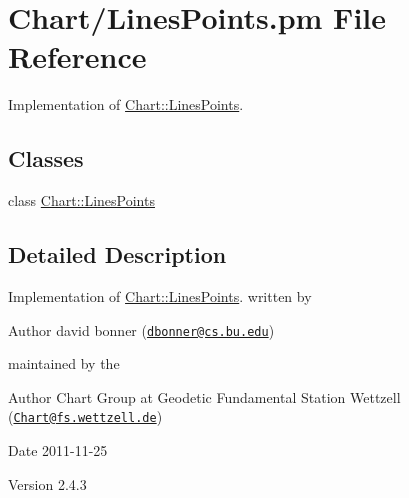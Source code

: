 \hypertarget{LinesPoints_8pm}{
\section{Chart/LinesPoints.pm File Reference}
\label{LinesPoints_8pm}
}


Implementation of \hyperlink{classChart_1_1LinesPoints}{Chart::LinesPoints}.  


\subsection*{Classes}
\begin{DoxyCompactItemize}
\item 
class \hyperlink{classChart_1_1LinesPoints}{Chart::LinesPoints}
\end{DoxyCompactItemize}


\subsection{Detailed Description}
Implementation of \hyperlink{classChart_1_1LinesPoints}{Chart::LinesPoints}. written by \begin{DoxyAuthor}{Author}
david bonner (\href{mailto:dbonner@cs.bu.edu}{\tt dbonner@cs.bu.edu})
\end{DoxyAuthor}
maintained by the \begin{DoxyAuthor}{Author}
Chart Group at Geodetic Fundamental Station Wettzell (\href{mailto:Chart@fs.wettzell.de}{\tt Chart@fs.wettzell.de}) 
\end{DoxyAuthor}
\begin{DoxyDate}{Date}
2011-\/11-\/25 
\end{DoxyDate}
\begin{DoxyVersion}{Version}
2.4.3 
\end{DoxyVersion}
